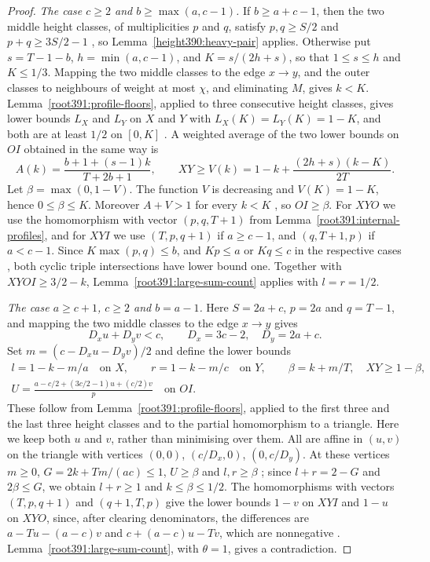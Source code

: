\begin{proof}
\emph{The case $c\ge2$ and $b\ge\max(a,c-1)$.} If $b\ge a+c-1$, then the two middle height classes, of multiplicities $p$ and $q$, satisfy $p,q\ge S/2$ and $p+q\ge3S/2-1$ , so
Lemma~\ref{height390:heavy-pair} applies.
Otherwise put $s=T-1-b$, $h=\min(a,c-1)$, and
$K=s/(2h+s)$, so that $1\le s\le h$ and $K\le1/3$.
Mapping the two middle classes to the edge $x\to y$, and the outer classes to neighbours of weight at most $\chi$, and eliminating
$M$, gives $k<K$. Lemma~\ref{root391:profile-floors}, applied to three consecutive height classes, gives lower bounds
$L_X$ and $L_Y$ on $X$ and $Y$ with $L_X(K)=L_Y(K)=1-K$, and both are at least
$1/2$ on $[0,K]$ .
A weighted average of the two lower bounds on $OI$ obtained in the same way is
\[
 A(k)=\frac{b+1+(s-1)k}{T+2b+1},
 \qquad XY\ge V(k)=1-k+\frac{(2h+s)(k-K)}{2T}.
\]
Let $\beta=\max(0,1-V)$. The function $V$ is decreasing
and $V(K)=1-K$, hence $0\le\beta\le K$. Moreover $A+V>1$ for every
$k<K$ , so $OI\ge\beta$.
For $XYO$ we use the homomorphism with vector $(p,q,T+1)$ from Lemma~\ref{root391:internal-profiles}, and for $XYI$ we use
$(T,p,q+1)$ if $a\ge c-1$, and $(q,T+1,p)$ if $a<c-1$.
Since $K\max(p,q)\le b$, and $Kp\le a$ or $Kq\le c$ in the respective
cases , both cyclic triple intersections have lower bound one.
Together with $XYOI\ge3/2-k$, Lemma~\ref{root391:large-sum-count} applies with $l=r=1/2$.

\emph{The case $a\ge c+1$, $c\ge2$ and $b=a-1$.} Here $S=2a+c$, $p=2a$ and $q=T-1$, and mapping the two middle
classes to the edge $x\to y$ gives
\[
 D_xu+D_yv<c,\qquad D_x=3c-2,\quad D_y=2a+c.
\]
Set $m=(c-D_xu-D_yv)/2$ and define the lower bounds
\[
\begin{gathered}
 l=1-k-m/a\quad\text{on }X,\qquad
 r=1-k-m/c\quad\text{on }Y,\qquad
 \beta=k+m/T,\quad XY\ge1-\beta,\\
 U=\frac{a-c/2+(3c/2-1)u+(c/2)v}{p}
 \quad\text{on }OI.
\end{gathered}
\]
These follow from Lemma~\ref{root391:profile-floors}, applied to the first three and the last three height classes and to the partial homomorphism to a triangle. Here we keep both $u$ and $v$, rather than minimising over them.
All are affine in $(u,v)$ on the triangle with vertices
$(0,0)$, $(c/D_x,0)$, $(0,c/D_y)$. At these vertices $m\ge0$,
$G=2k+Tm/(ac)\le1$, $U\ge\beta$ and $l,r\ge\beta$ ; since
$l+r=2-G$ and $2\beta\le G$, we obtain $l+r\ge1$ and
$k\le\beta\le1/2$. The homomorphisms with vectors $(T,p,q+1)$ and $(q+1,T,p)$ give
the lower bounds $1-v$ on $XYI$ and $1-u$ on $XYO$, since, after clearing denominators, the differences are $a-Tu-(a-c)v$ and $c+(a-c)u-Tv$, which are nonnegative .
Lemma~\ref{root391:large-sum-count}, with $\theta=1$, gives a contradiction.
\end{proof}

